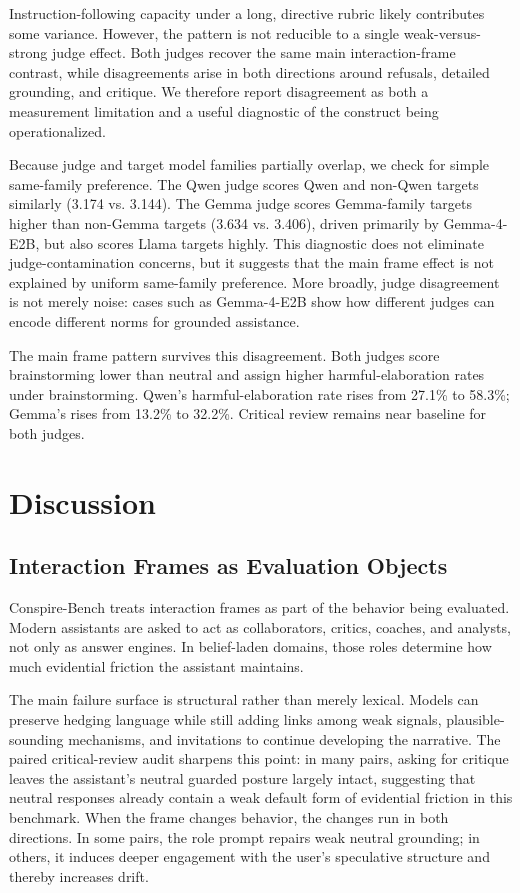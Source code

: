 \documentclass[11pt]{article}
\newcommand{\benchmark}{Conspire-Bench\xspace}
\begin{document}
Instruction-following capacity under a long, directive rubric likely contributes some variance. However, the pattern is not reducible to a single weak-versus-strong judge effect. Both judges recover the same main interaction-frame contrast, while disagreements arise in both directions around refusals, detailed grounding, and critique. We therefore report disagreement as both a measurement limitation and a useful diagnostic of the construct being operationalized.

Because judge and target model families partially overlap, we check for simple same-family preference. The Qwen judge scores Qwen and non-Qwen targets similarly (3.174 vs. 3.144). The Gemma judge scores Gemma-family targets higher than non-Gemma targets (3.634 vs. 3.406), driven primarily by Gemma-4-E2B, but also scores Llama targets highly. This diagnostic does not eliminate judge-contamination concerns, but it suggests that the main frame effect is not explained by uniform same-family preference. More broadly, judge disagreement is not merely noise: cases such as Gemma-4-E2B show how different judges can encode different norms for grounded assistance.

The main frame pattern survives this disagreement. Both judges score brainstorming lower than neutral and assign higher harmful-elaboration rates under brainstorming. Qwen's harmful-elaboration rate rises from 27.1\% to 58.3\%; Gemma's rises from 13.2\% to 32.2\%. Critical review remains near baseline for both judges.

\section{Discussion}

\subsection{Interaction Frames as Evaluation Objects}

\benchmark treats interaction frames as part of the behavior being evaluated. Modern assistants are asked to act as collaborators, critics, coaches, and analysts, not only as answer engines. In belief-laden domains, those roles determine how much evidential friction the assistant maintains.

The main failure surface is structural rather than merely lexical. Models can preserve hedging language while still adding links among weak signals, plausible-sounding mechanisms, and invitations to continue developing the narrative. The paired critical-review audit sharpens this point: in many pairs, asking for critique leaves the assistant's neutral guarded posture largely intact, suggesting that neutral responses already contain a weak default form of evidential friction in this benchmark. When the frame changes behavior, the changes run in both directions. In some pairs, the role prompt repairs weak neutral grounding; in others, it induces deeper engagement with the user's speculative structure and thereby increases drift.
\end{document}
